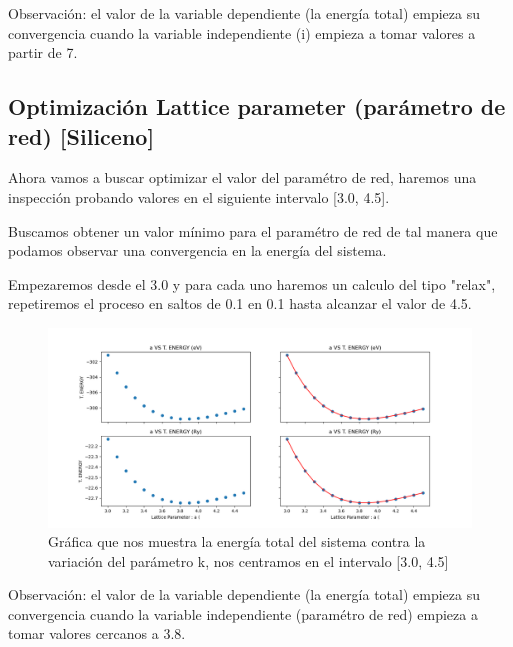 Observación: el valor de la variable dependiente (la energía total) empieza su convergencia cuando 
la variable independiente (i) empieza a tomar valores a partir de 7.




\subsection{Optimización Lattice parameter (parámetro de red) [Siliceno]}

Ahora vamos a buscar optimizar el valor del paramétro de red, haremos una inspección probando valores
en el siguiente intervalo [3.0, 4.5].

\vspace{0.5cm}

Buscamos obtener un valor mínimo para el paramétro de red de tal manera que podamos observar una convergencia 
en la energía del sistema.

\vspace{0.5cm}

Empezaremos desde el 3.0 y para cada uno haremos un calculo del tipo "relax", repetiremos el proceso
en saltos de 0.1 en 0.1 hasta alcanzar el valor de 4.5.

\begin{figure}[H]
    \centering
    \includegraphics[scale=0.5]{images_siliceno/lattice_parameter_vs_T_energy.png}
    \caption{Gráfica que nos muestra la energía total del sistema contra la variación del parámetro k, nos centramos en el intervalo [3.0, 4.5]}
\end{figure}

Observación: el valor de la variable dependiente (la energía total) empieza su convergencia cuando 
la variable independiente (paramétro de red) empieza a tomar valores cercanos a 3.8.

\newpage

